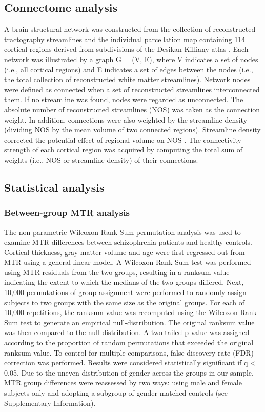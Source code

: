 \begin{refsection}
\subsection*{Connectome analysis}
A brain structural network was constructed from the collection of reconstructed tractography streamlines and the individual parcellation map containing 114 cortical regions derived from subdivisions of the Desikan-Killiany atlas \citep{CAMMOUN2012386,DESIKAN2006968,Fischl2004parcellation}. Each network was illustrated by a graph G = (V, E), where V indicates a set of nodes (i.e., all cortical regions) and E indicates a set of edges between the nodes (i.e., the total collection of reconstructed white matter streamlines). Network nodes were defined as connected when a set of reconstructed streamlines interconnected them. If no streamline was found, nodes were regarded as unconnected. The absolute number of reconstructed streamlines (NOS) was taken as the connection weight. In addition, connections were also weighted by the streamline density (dividing NOS by the mean volume of two connected regions). Streamline density corrected the potential effect of regional volume on NOS \citep{Hagmann2008MappingTS,vanDenHeuvel2011RichclubOO}. The connectivity strength of each cortical region was acquired by computing the total sum of weights (i.e., NOS or streamline density) of their connections.

\subsection*{Statistical analysis}
\subsubsection*{Between-group MTR analysis}
The non-parametric Wilcoxon Rank Sum permutation analysis was used to examine MTR differences between schizophrenia patients and healthy controls. Cortical thickness, gray matter volume and age were first regressed out from MTR using a general linear model. A Wilcoxon Rank Sum test was performed using MTR residuals from the two groups, resulting in a ranksum value indicating the extent to which the medians of the two groups differed. Next, 10,000 permutations of group assignment were performed to randomly assign subjects to two groups with the same size as the original groups. For each of 10,000 repetitions, the ranksum value was recomputed using the Wilcoxon Rank Sum test to generate an empirical null-distribution. The original ranksum value was then compared to the null-distribution.  A two-tailed p-value was assigned according to the proportion of random permutations that exceeded the original ranksum value. To control for multiple comparisons, false discovery rate (FDR) correction was performed. Results were considered statistically significant if q < 0.05. Due to the uneven distribution of gender across the groups in our sample, MTR group differences were reassessed by two ways: using male and female subjects only and adopting a subgroup of gender-matched controls (see Supplementary Information).


\end{refsection}
